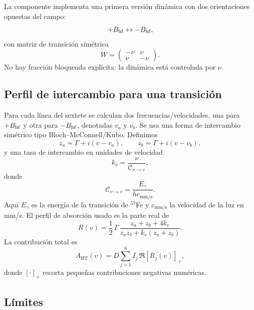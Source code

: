 La componente  implementa una primera versión dinámica con dos
orientaciones opuestas del campo:
\begin{equation}
  +B_{\mathrm{hf}} \leftrightarrow -B_{\mathrm{hf}},
\end{equation}
con matriz de transición simétrica
\begin{equation}
  W=\begin{pmatrix}-\nu & \nu\\ \nu & -\nu\end{pmatrix}.
\end{equation}
No hay fracción bloqueada explícita: la dinámica está controlada por $\nu$.

\subsection{Perfil de intercambio para una transición}

Para cada línea del sextete se calculan dos frecuencias/velocidades, una para
$+B_{\mathrm{hf}}$ y otra para $-B_{\mathrm{hf}}$, denotadas $v_a$ y $v_b$. Se usa una forma de
intercambio simétrico tipo Bloch--McConnell/Kubo. Definimos
\begin{equation}
  z_a = \Gamma + i(v-v_a),\qquad z_b = \Gamma + i(v-v_b),
\end{equation}
y una tasa de intercambio en unidades de velocidad
\begin{equation}
  k_v = \frac{\nu}{\mathcal{C}_{\nu\to v}},
\end{equation}
donde
\begin{equation}
  \mathcal{C}_{\nu\to v}=\frac{E_\gamma}{h c_{\mathrm{mm/s}}}.
\end{equation}
Aquí $E_\gamma$ es la energía de la transición de $^{57}$Fe y
$c_{\mathrm{mm/s}}$ la velocidad de la luz en mm/s. El perfil de absorción usado
es la parte real de
\begin{equation}
  R(v)=\frac{1}{2}\,\Gamma\,
  \frac{z_a+z_b+4k_v}{z_a z_b+k_v(z_a+z_b)}.
  \label{eq:exchange}
\end{equation}
La contribución total es
\begin{equation}
  A_{\mathrm{BT}}(v)=D\sum_{j=1}^{6} I_j\,\Re\left[R_j(v)\right]_+,
\end{equation}
donde $[\cdot]_+$ recorta pequeñas contribuciones negativas numéricas.

\subsection{Límites}

